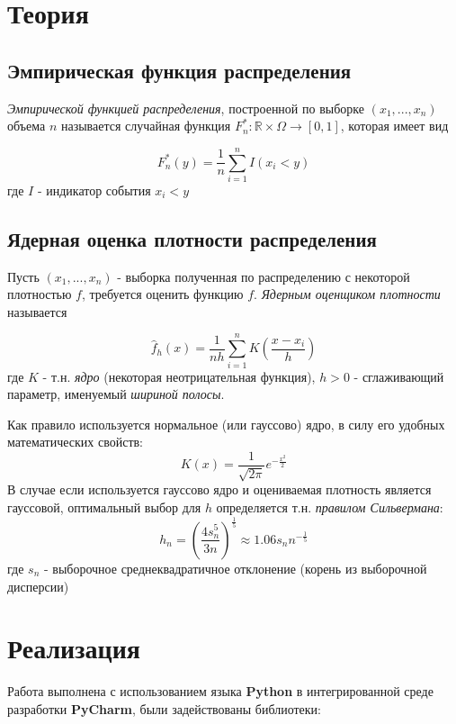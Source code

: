 \documentclass[12pt,a4paper]{article}
\begin{document}
\section{Теория}
\subsection{Эмпирическая функция распределения}
\textit{Эмпирической функцией распределения}, построенной по выборке $(x_1, ..., x_n)$ объема $n$ называется случайная функция $F_n^*: \mathbb{R} \times \Omega \to [0,1]$, которая имеет вид

\begin{equation}
	F_n^*(y) = \frac{1}{n}\sum_{i=1}^n{I(x_i < y)}
\end{equation}
где $I$ - индикатор события $x_i < y$\cite{chernova}

\subsection{Ядерная оценка плотности распределения}
Пусть $(x_1, ..., x_n)$ - выборка полученная по распределению с некоторой плотностью $f$, требуется оценить функцию $f$. \textit{Ядерным оценщиком плотности} называется\cite{kde}

\begin{equation}
	\hat{f}_h(x) = \frac{1}{nh}\sum_{i=1}^{n}{K\left(\frac{x-x_i}{h}\right)}
\end{equation}
где $K$ - т.н. \textit{ядро} (некоторая неотрицательная функция), $h>0$ - сглаживающий параметр, именуемый \textit{шириной полосы}.
\newline

Как правило используется нормальное (или гауссово) ядро, в силу его удобных математических свойств:
\begin{equation}
	K(x) = \frac{1}{\sqrt{2\pi}}e^{-\frac{x^2}{2}}
\end{equation}
\newline
\label{silverman}
В случае если используется гауссово ядро и оцениваемая плотность является гауссовой, оптимальный выбор для $h$ определяется т.н. \textit{правилом Сильвермана}\cite{kde}:
\begin{equation}
	h_n = \left(\frac{4s_n^5}{3n}\right)^{\frac{1}{5}}\approx 1.06s_n n^{-\frac{1}{5}}
\end{equation}
где $s_n$ - выборочное среднеквадратичное отклонение (корень из выборочной дисперсии)

\pagebreak

\section{Реализация}
\label{sec:impl}
Работа выполнена с использованием языка \textbf{Python} в интегрированной среде разработки \textbf{PyCharm}, были задействованы библиотеки:
\end{document}
